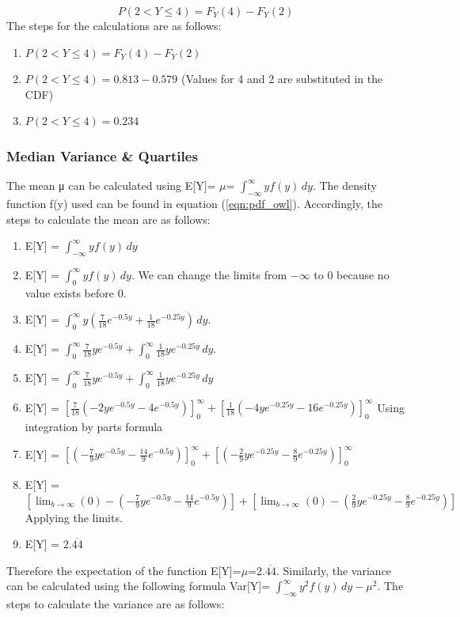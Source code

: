 \begin{equation}
 P(2< Y \le 4) = F_{Y}(4) - F_{Y}(2)   
\end{equation}
The steps for the calculations are as follows:
\begin{enumerate}
    \item $ P(2< Y \le 4) = F_{Y}(4) - F_{Y}(2)$
    \item $ P(2< Y \le 4) = 0.813 - 0.579$ (Values for 4 and 2 are substituted in the CDF)
    \item $ P(2< Y \le 4) = 0.234$
\end{enumerate}
    
\subsubsection{Median Variance \& Quartiles}    

The mean μ can be calculated using E[Y]= $\mu$= $\int_{-\infty}^{\infty} yf(y)\,dy$. The density function f(y) used can be found in equation (\ref{eqn:pdf_owl}). Accordingly, the steps to calculate the mean are as follows: 

\begin{enumerate}
    \item E[Y] = $\int_{-\infty}^{\infty} yf(y)\,dy$
    \item E[Y] = $\int_{0}^{\infty} yf(y)\,dy$.  We can change the limits from $-\infty$ to 0 because no value exists before 0.
    \item E[Y] = $\int_{0}^{\infty} y(\frac{7}{18}e^{-0.5y} + \frac{1}{18}e^{-0.25y})\,dy$.
    \item E[Y] = $\int_{0}^{\infty} \frac{7}{18}ye^{-0.5y} + \int_{0}^{\infty} \frac{1}{18}ye^{-0.25y}\,dy$.
    \item E[Y] = $\int_{0}^{\infty} \frac{7}{18}ye^{-0.5y} + \int_{0}^{\infty} \frac{1}{18}ye^{-0.25y}\,dy$ \label{eqn:mean_line_5}
    \item E[Y] = $[\frac{7}{18}(-2ye^{-0.5y}-4e^{-0.5y})]_0^\infty + [\frac{1}{18}(-4ye^{-0.25y}-16e^{-0.25y})]_0^\infty$ Using integration by parts formula
    \item E[Y] = $[(-\frac{7}{9}ye^{-0.5y}-\frac{14}{9}e^{-0.5y})]_0^\infty + [(-\frac{2}{9}ye^{-0.25y}-\frac{8}{9}e^{-0.25y})]_0^\infty$
    \item E[Y] = $[\lim_{b\to\infty}(0)-(-\frac{7}{9}ye^{-0.5y}-\frac{14}{9}e^{-0.5y})] + [\lim_{b\to\infty}(0)-(\frac{2}{9}ye^{-0.25y}-\frac{8}{9}e^{-0.25y})]$ Applying the limits.
    \item E[Y] = $2.\overline{44}$
\end{enumerate}
Therefore the expectation of the function E[Y]=$\mu$=$2.\overline{44}$. Similarly, the variance can be calculated using the following formula Var[Y]= $\int_{-\infty}^{\infty}y^2f(y)\,dy - \mu^2$. The steps to calculate the variance are as follows: 


